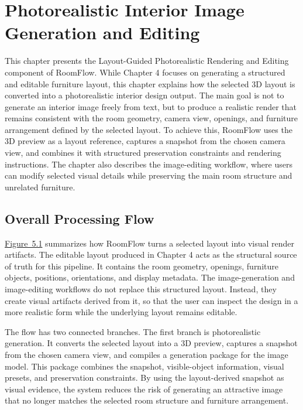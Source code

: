 \chapter{Photorealistic Interior Image Generation and Editing}

This chapter presents the Layout-Guided Photorealistic Rendering and Editing component of RoomFlow. While Chapter 4 focuses on generating a structured and editable furniture layout, this chapter explains how the selected 3D layout is converted into a photorealistic interior design output. The main goal is not to generate an interior image freely from text, but to produce a realistic render that remains consistent with the room geometry, camera view, openings, and furniture arrangement defined by the selected layout. To achieve this, RoomFlow uses the 3D preview as a layout reference, captures a snapshot from the chosen camera view, and combines it with structured preservation constraints and rendering instructions. The chapter also describes the image-editing workflow, where users can modify selected visual details while preserving the main room structure and unrelated furniture.

\section{Overall Processing Flow}\label{sec:problem2-overall-processing-flow}

\hyperref[fig:5-1]{Figure~5.1} summarizes how RoomFlow turns a selected layout into visual render artifacts. The editable layout produced in Chapter 4 acts as the structural source of truth for this pipeline. It contains the room geometry, openings, furniture objects, positions, orientations, and display metadata. The image-generation and image-editing workflows do not replace this structured layout. Instead, they create visual artifacts derived from it, so that the user can inspect the design in a more realistic form while the underlying layout remains editable.

The flow has two connected branches. The first branch is photorealistic generation. It converts the selected layout into a 3D preview, captures a snapshot from the chosen camera view, and compiles a generation package for the image model. This package combines the snapshot, visible-object information, visual presets, and preservation constraints. By using the layout-derived snapshot as visual evidence, the system reduces the risk of generating an attractive image that no longer matches the selected room structure and furniture arrangement.

